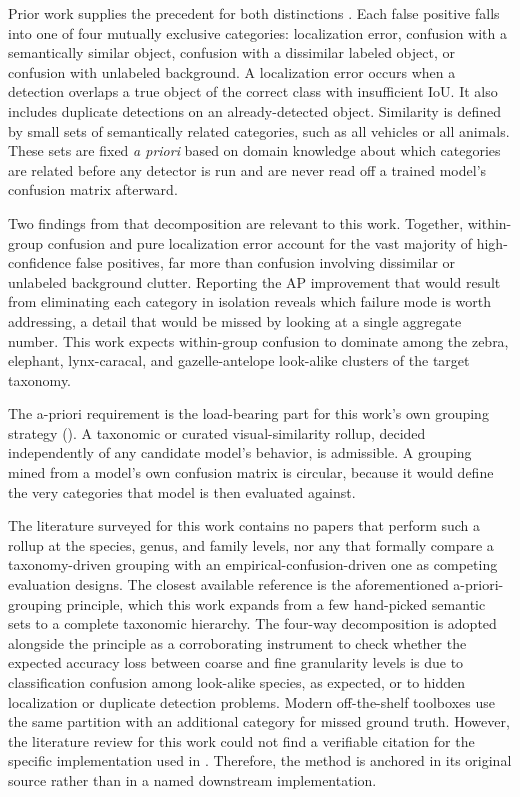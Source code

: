 Prior work supplies the precedent for both distinctions \cite{hoiemDiagnosingErrorObject2012}. Each false positive falls into one of four mutually exclusive categories: localization error, confusion with a semantically similar object, confusion with a dissimilar labeled object, or confusion with unlabeled background. A localization error occurs when a detection overlaps a true object of the correct class with insufficient IoU. It also includes duplicate detections on an already-detected object. Similarity is defined by small sets of semantically related categories, such as all vehicles or all animals. These sets are fixed \textit{a priori} based on domain knowledge about which categories are related before any detector is run and are never read off a trained model's confusion matrix afterward.

Two findings from that decomposition are relevant to this work. Together, within-group confusion and pure localization error account for the vast majority of high-confidence false positives, far more than confusion involving dissimilar or unlabeled background clutter. Reporting the AP improvement that would result from eliminating each category in isolation reveals which failure mode is worth addressing, a detail that would be missed by looking at a single aggregate number. This work expects within-group confusion to dominate among the zebra, elephant, lynx-caracal, and gazelle-antelope look-alike clusters of the target taxonomy.

The a-priori requirement is the load-bearing part for this work's own grouping strategy (). A taxonomic or curated visual-similarity rollup, decided independently of any candidate model's behavior, is admissible. A grouping mined from a model's own confusion matrix is circular, because it would define the very categories that model is then evaluated against.

The literature surveyed for this work contains no papers that perform such a rollup at the species, genus, and family levels, nor any that formally compare a taxonomy-driven grouping with an empirical-confusion-driven one as competing evaluation designs. The closest available reference is the aforementioned a-priori-grouping principle, which this work expands from a few hand-picked semantic sets to a complete taxonomic hierarchy. The four-way decomposition is adopted alongside the principle as a corroborating instrument to check whether the expected accuracy loss between coarse and fine granularity levels is due to classification confusion among look-alike species, as expected, or to hidden localization or duplicate detection problems. Modern off-the-shelf toolboxes use the same partition with an additional category for missed ground truth. However, the literature review for this work could not find a verifiable citation for the specific implementation used in . Therefore, the method is anchored in its original source rather than in a named downstream implementation.

